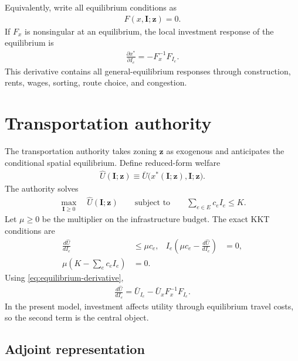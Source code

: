 \documentclass[12pt,a4paper]{article}
\newcommand{\1}{\mathbb 1}
\begin{document}
Equivalently, write all equilibrium conditions as
\begin{align}
F(x,\mathbf I;\mathbf z)=0.
\label{eq:equilibrium-system}
\end{align}
If $F_x$ is nonsingular at an equilibrium, the local investment response of the equilibrium is
\begin{align}
\frac{\partial x^*}{\partial I_e}
=
-F_x^{-1}F_{I_e}.
\label{eq:equilibrium-derivative}
\end{align}
This derivative contains all general-equilibrium responses through construction, rents, wages, sorting, route choice, and congestion.

\section{Transportation authority}

The transportation authority takes zoning $\mathbf z$ as exogenous and anticipates the conditional spatial equilibrium. Define reduced-form welfare
\begin{align}
\widehat U(\mathbf I;\mathbf z)
\equiv
\bar U\bigl(x^*(\mathbf I;\mathbf z),\mathbf I;\mathbf z\bigr).
\label{eq:reduced-welfare}
\end{align}
The authority solves
\begin{align}
\max_{\mathbf I\geq0}
\quad
\widehat U(\mathbf I;\mathbf z)
\qquad
\text{subject to}
\qquad
\sum_{e\in E}c_eI_e\leq K.
\label{eq:transport-problem}
\end{align}
Let $\mu\geq0$ be the multiplier on the infrastructure budget. The exact KKT conditions are
\begin{align}
\frac{d\widehat U}{dI_e}
&\leq \mu c_e,
&
I_e\left(\mu c_e-\frac{d\widehat U}{dI_e}\right)&=0,
\label{eq:transport-kkt}\\
\mu\left(K-\sum_ec_eI_e\right)&=0.
\label{eq:budget-kkt}
\end{align}
Using \eqref{eq:equilibrium-derivative},
\begin{align}
\frac{d\widehat U}{dI_e}
=
\bar U_{I_e}
-
\bar U_xF_x^{-1}F_{I_e}.
\label{eq:total-investment-gradient}
\end{align}
In the present model, investment affects utility through equilibrium travel costs, so the second term is the central object.

\subsection{Adjoint representation}
\end{document}
